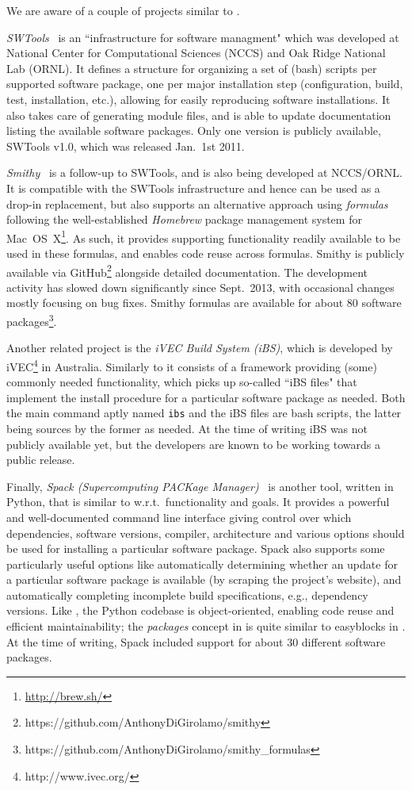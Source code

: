We are aware of a couple of projects similar to \easybuild{}.

\emph{SWTools}~\cite{swtools, jones08} is an ``infrastructure for software
managment" which was developed at National Center for Computational Sciences (NCCS)
and Oak Ridge National Lab (ORNL). It defines a structure for organizing a set of
(bash) scripts per supported software package, one per major installation step
(configuration, build, test, installation, etc.), allowing for easily reproducing 
software installations. It also takes care of generating module files, and is
able to update documentation listing the available software packages.
Only one version is publicly available, SWTools v1.0, which was released Jan.~1st 2011.

\emph{Smithy}~\cite{smithy} is a follow-up to SWTools, and is also being developed
at NCCS/ORNL. It is compatible with the SWTools infrastructure and hence can be
used as a drop-in replacement, but also supports an alternative approach using
\emph{formulas} following the well-established \emph{Homebrew} package management 
system for Mac~OS~X\footnote{\url{http://brew.sh/}}. As such, it provides
supporting functionality readily available to be used in these formulas, and enables
code reuse across formulas. Smithy is publicly available via
GitHub\footnote{https://github.com/AnthonyDiGirolamo/smithy} alongside detailed
documentation. The development activity has slowed down significantly since
Sept.~2013, with occasional changes mostly focusing on bug fixes.
Smithy formulas are available for about 80 software
packages\footnote{https://github.com/AnthonyDiGirolamo/smithy\_formulas}.

Another related project is the \emph{iVEC Build System (iBS)}, which is developed 
by iVEC\footnote{http://www.ivec.org/} in Australia. Similarly to \easybuild{}
it consists of a framework providing (some) commonly needed functionality, which
picks up so-called ``iBS files" that implement the install procedure for a 
particular software package as needed. Both the main command aptly named
\texttt{\small ibs} and the iBS files are bash scripts, the latter being sources by
the former as needed. At the time of writing iBS was not publicly available yet, but
the developers are known to be working towards a public release.

Finally, \emph{Spack (Supercomputing PACKage Manager)}~\cite{spack} is another
tool, written in Python, that is similar to \easybuild{} w.r.t.\ functionality and
goals. It provides a powerful and well-documented command line interface giving
control over which dependencies, software versions, compiler, architecture and
various options should be used for installing a particular software package.
Spack also supports some particularly useful options like automatically determining
whether an update for a particular software package is available
(by scraping the project's website), and automatically completing
incomplete build specifications, e.g., dependency versions. Like
\easybuild{}, the Python codebase is object-oriented, enabling code reuse and
efficient maintainability; the \emph{packages} concept in is quite similar to
easyblocks in \easybuild{}. At the time of writing, Spack included support for about
30 different software packages.

